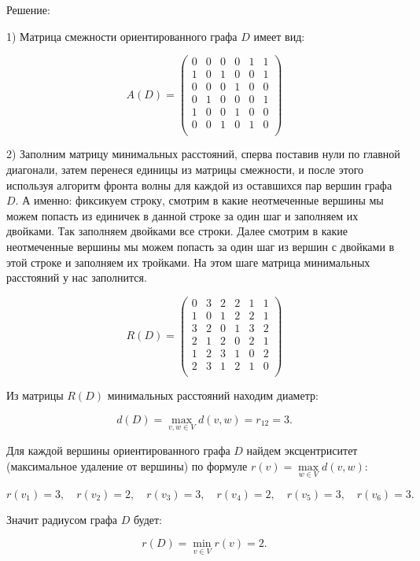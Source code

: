 \documentclass[fleqn]{article}
\begin{document}
\begin{center}Решение:\end{center}

1) Матрица смежности ориентированного графа $D$ имеет вид:

$$A(D)=
\begin{pmatrix}
0 & 0 & 0 & 0 & 1 & 1 \\
1 & 0 & 1 & 0 & 0 & 1 \\
0 & 0 & 0 & 1 & 0 & 0 \\
0 & 1 & 0 & 0 & 0 & 1 \\
1 & 0 & 0 & 1 & 0 & 0 \\
0 & 0 & 1 & 0 & 1 & 0 \\
\end{pmatrix}
$$

2) Заполним матрицу минимальных расстояний, сперва поставив нули по главной диагонали, затем перенеся единицы из матрицы смежности, и после этого используя алгоритм фронта волны для каждой из оставшихся пар вершин графа $D$. А именно: фиксикуем строку, смотрим в какие неотмеченные вершины мы можем попасть из единичек в данной строке за один шаг и заполняем их двойками. Так заполняем двойками все строки. Далее смотрим в какие неотмеченные вершины мы можем попасть за один шаг из вершин с двойками в этой строке и заполняем их тройками. На этом шаге матрица минимальных расстояний у нас заполнится.

$$R(D)=
\begin{pmatrix}
0 & 3 & 2 & 2 & 1 & 1 \\
1 & 0 & 1 & 2 & 2 & 1 \\
3 & 2 & 0 & 1 & 3 & 2 \\
2 & 1 & 2 & 0 & 2 & 1 \\
1 & 2 & 3 & 1 & 0 & 2 \\
2 & 3 & 1 & 2 & 1 & 0 \\
\end{pmatrix}
$$

Из матрицы $R(D)$ минимальных расстояний находим диаметр:

$$d(D)=\max\limits_{v,w\in V} d(v,w)=r_{12}=3.$$

Для каждой вершины ориентированного графа $D$ найдем эксцентриситет (максимальное удаление от вершины) по формуле $r(v)=\max\limits_{w\in V} d(v,w)$:

$$r(v_1)=3,\quad r(v_2)=2,\quad r(v_3)=3,\quad r(v_4)=2,\quad r(v_5)=3,\quad r(v_6)=3.$$

Значит радиусом графа $D$ будет:

$$r(D)=\min\limits_{v\in V}r(v)=2.$$
\end{document}
